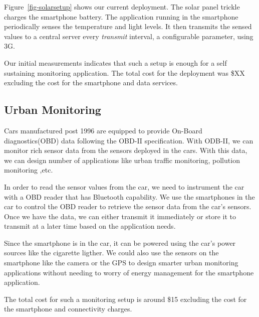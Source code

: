Figure~\ref{fig-solarsetup} shows our current deployment. The solar panel trickle
charges the smartphone battery. The application running in the smartphone
periodically senses the temperature and light levels. It then transmits the
sensed values to a central server every \textit{transmit} interval, a
configurable parameter, using 3G. 

Our initial measurements indicates that such a setup is
enough for a self sustaining monitoring application. The total cost for the
deployment was \$XX excluding the cost for the smartphone and data services.

\subsection{Urban Monitoring}
Cars manufactured post 1996 are equipped to provide On-Board diagnostics(OBD)
data following the OBD-II specification. With ODB-II, we can monitor rich
sensor data from the sensors deployed in the cars. With this data, we can design number of
applications like urban traffic monitoring, pollution monitoring ,etc. 

In order to read the sensor values from the car, we need to instrument the car
with a OBD
reader that has Bluetooth capability. We use the smartphones in the car to control
the OBD reader to retrieve the sensor data from the car's sensors. Once we have
the data, we can either transmit it immediately or store it to transmit at a
later time based on the application needs.

Since the smartphone is in the car, it can be powered using the car's power
sources like the cigarette ligther. We could also use the sensors on the
smartphone like the camera or the GPS to design smarter urban monitoring
applications without needing to worry of energy management for the smartphone
application.

The total cost for such a monitoring setup is around \$15 excluding the cost
for the smartphone and connectivity charges.

